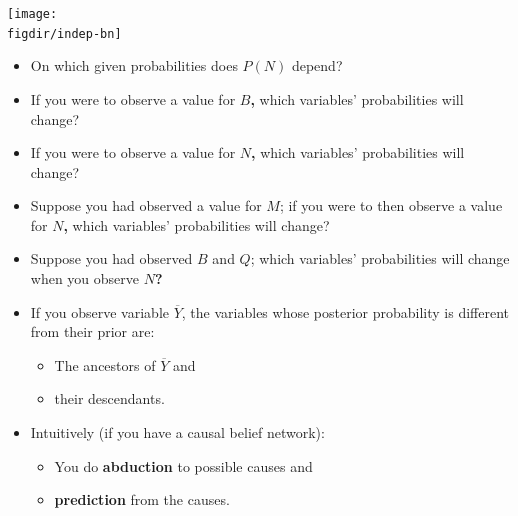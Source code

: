 \documentclass[12pt]{beamer} %
\newcommand{\figdir}{../../figures/ch06}
\begin{document}



\begin{slide}
\begin{center}
\texttt{[image: \\figdir/indep-bn]}
\end{center}


\end{slide}

\begin{slide}
\begin{itemize}
\item On which given probabilities does \textbf{$P(N)$} depend?
\item If you were to observe a value for \textbf{$B$,} which variables'
probabilities will change?
\item If you were to observe a value for \textbf{$N$,} which variables'
probabilities will change?
\item Suppose you had observed a value for $M$; if you were to then observe a value for \textbf{$N$,} which variables'
probabilities will change?
\item Suppose you had observed $B$ and $Q$; which variables'
probabilities will change when you observe \textbf{$N$?}
\end{itemize}


\end{slide}


\begin{slide}
\begin{itemize}
\item If you observe variable $\overline{Y}$, the variables whose
posterior probability is different from their prior are:
\begin{itemize}
\item The ancestors of $\overline{Y}$ and
\item their descendants.
\end{itemize}
\item Intuitively (if you have a causal belief network):
\begin{itemize}
\item You do \textbf{abduction} to possible causes and
\item \textbf{prediction} from the causes.
\end{itemize}
\end{itemize}
\end{slide}
\end{document}
